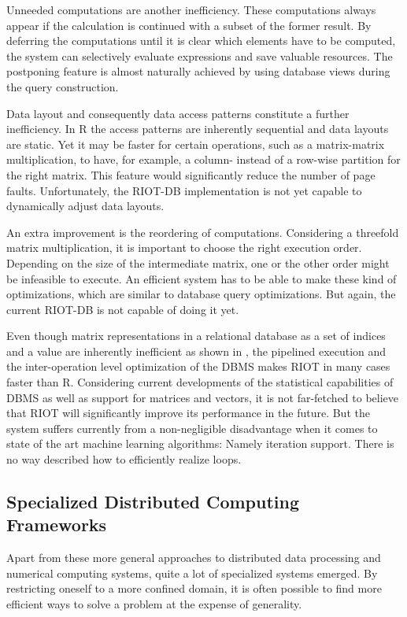 Unneeded computations are another inefficiency. These computations always appear if the calculation is continued with a subset of the former result.
By deferring the computations until it is clear which elements have to be computed,
the system can selectively evaluate expressions and save valuable resources.
The postponing feature is almost naturally achieved by using database views during the query construction.

Data layout and consequently data access patterns constitute a further inefficiency.
In R the access patterns are inherently sequential and data layouts are static.
Yet it may be faster for certain operations, such as a matrix-matrix multiplication, to have, for example, a column- instead of a row-wise partition for the right matrix.
This feature would significantly reduce the number of page faults.
Unfortunately, the RIOT-DB implementation is not yet capable to dynamically adjust data layouts.

An extra improvement is the reordering of computations.
Considering a threefold matrix multiplication, it is important to choose the right execution order.
Depending on the size of the intermediate matrix, one or the other order might be infeasible to execute.
An efficient system has to be able to make these kind of optimizations, which are similar to database query optimizations.
But again, the current RIOT-DB is not capable of doing it yet.

Even though matrix representations in a relational database as a set of indices and a value are inherently inefficient as shown in \cite{stonebraker:2007a}, the pipelined execution and the inter-operation level optimization of the DBMS makes RIOT in many cases faster than R.
Considering current developments of the statistical capabilities of DBMS as well as support for matrices and vectors, it is not far-fetched to believe that RIOT will significantly improve its performance in the future.
But the system suffers currently from a non-negligible disadvantage when it comes to state of the art machine learning algorithms: Namely iteration support.
There is no way described how to efficiently realize loops.

\subsection{Specialized Distributed Computing Frameworks}

Apart from these more general approaches to distributed data processing and numerical computing systems, quite a lot of specialized systems emerged.
By restricting oneself to a more confined domain, it is often possible to find more efficient ways to solve a problem at the expense of generality.

